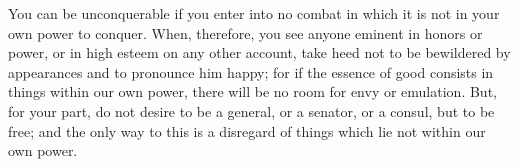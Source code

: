 You can be unconquerable if you enter into no combat in which it is not
in your own power to conquer. When, therefore, you see anyone eminent in
honors or power, or in high esteem on any other account, take heed not to
be bewildered by appearances and to pronounce him happy; for if the
essence of good consists in things within our own power, there will be no
room for envy or emulation. But, for your part, do not desire to be a
general, or a senator, or a consul, but to be free; and the only way to
this is a disregard of things which lie not within our own power.
